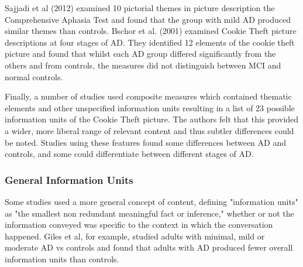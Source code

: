 \documentclass{article}
\begin{document}
Sajjadi et al (2012) examined 10 pictorial themes in picture description the Comprehensive Aphasia Test and found that the group with mild AD produced similar themes than controls. Bschor et al. (2001) examined Cookie Theft picture descriptions at four stages of AD. They identified 12 elements of the cookie theft picture and found that whilst each AD group differed significantly from the others and from controls, the measures did not distinguish between MCI and normal controls. \newline
\par
Finally, a number of studies used composite measures which contained thematic elements and other unspecified information units resulting in a list of 23 possible information units of the Cookie Theft picture. The authors felt that this provided a wider, more liberal range of relevant content and thus subtler differences could be noted. Studies using these features found some differences between AD and controls, and some could differentiate between different stages of AD.
\subsubsection{General Information Units}
Some studies used a more general concept of content, defining "information units" as "the smallest non redundant meaningful fact or inference," whether or not the information conveyed was specific to the context in which the conversation happened. Giles et al, for example, studied adults with minimal, mild or moderate AD vs controls and found that adults with AD produced fewer overall information units than controls.
\end{document}
